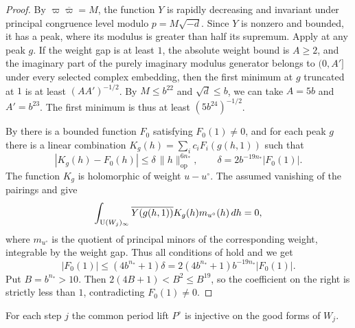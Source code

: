 \begin{proof}
By $\varpi\overline{\varpi}=M$, the function $Y$ is rapidly decreasing and invariant under principal congruence level modulo $p=M\sqrt{-d}$. Since $Y$ is nonzero and bounded, it has a peak, where its modulus is greater than half its supremum. Apply  at any peak $g$. If the weight gap is at least $1$, the absolute weight bound is $A\ge2$, and the imaginary part of the purely imaginary modulus generator belongs to $(0,A']$ under every selected complex embedding, then the first minimum at $g$ truncated at $1$ is at least $(AA')^{-1/2}$. By $M\le b^{22}$ and $\sqrt d\le b$, we can take $A=5b$ and $A'=b^{23}$. The first minimum is thus at least $(5b^{24})^{-1/2}$.

By  there is a bounded function $F_0$ satisfying $F_0(1)\ne0$, and for each peak $g$ there is a linear combination $K_g(h)=\sum_i c_iF_i(g(h,1))$ such that
\[
 |K_g(h)-F_0(h)|\le \delta\,\|h\|_{\mathrm{op}}^{6n_*},
 \qquad \delta=2b^{-19n_*}|F_0(1)|.
\]
The function $K_g$ is holomorphic of weight $u-u^\circ$. The assumed vanishing of the pairings and  give
\[
 \int_{\operatorname{U}(W_j)_\infty}
  \overline{Y(g(h,1))}K_g(h)m_{u^\circ}(h)\,dh=0,
\]
where $m_{u^\circ}$ is the quotient of principal minors of the corresponding weight, integrable by the weight gap. Thus all conditions of  hold and we get
\[
 |F_0(1)|\le(4b^{n_*}+1)\delta
      =2(4b^{n_*}+1)b^{-19n_*}|F_0(1)|.
\]
Put $B=b^{n_*}>10$. Then $2(4B+1)<B^2\le B^{19}$, so the coefficient on the right is strictly less than $1$, contradicting $F_0(1)\ne0$.
\end{proof}

\begin{lemma}
\label{lem:c-period-injective}
\emitthmsource
For each step $j$ the common period lift $P^\circ$ is injective on the good forms of $W_j$.
\end{lemma}

